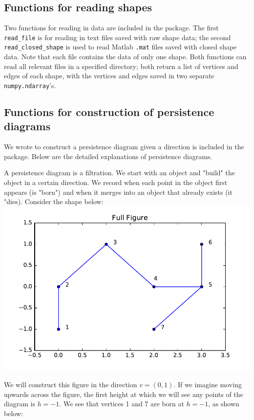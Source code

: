 \documentclass[11pt]{amsart}
\begin{document}
\subsection{Functions for reading shapes}
Two functions for reading in data are included in the package. The first \texttt{read\_file} is for reading in text files saved with raw shape data; the second \texttt{read\_closed\_shape} is used to read Matlab \texttt{.mat} files saved with closed shape data. Note that each file contains the data of only one shape. Both functions can read all relevant files in a specified directory; both return a list of vertices and edges of each shape, with the vertices and edges saved in two separate \texttt{numpy.ndarray}'s.

\subsection{Functions for construction of persistence diagrams}
We wrote  to construct a persistence diagram given a direction is included in the package. Below are the detailed explanations of persistence diagrams.

A persistence diagram is a filtration.  We start with an object and "build" the object in a certain direction.  We record when each point in the object first appears (is "born") and when it merges into an object that already exists (it "dies).  Consider the shape below:
\includegraphics[width = \textwidth]{full_fig.pdf}

We will construct this figure in the direction $v = (0,1)$.  If we imagine moving upwards across the figure, the first height at which we will see any points of the diagram is $h=-1$.  We see that vertices 1 and 7 are born at $h = -1$, as shown below:
\end{document}
